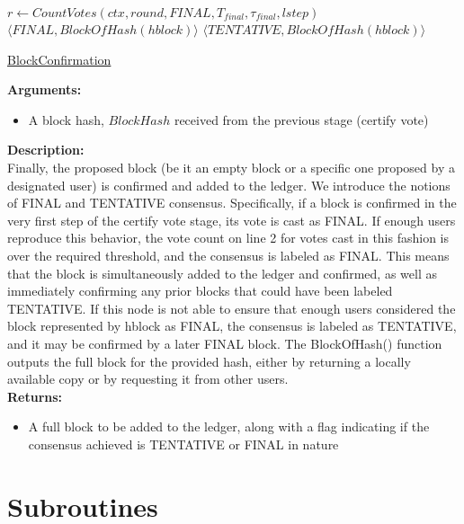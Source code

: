\documentclass[10pt,a4paper]{article}
\begin{document}
\begin{algorithm}
    \begin{algorithmic}[H]

    \State $r \gets CountVotes(ctx, round, FINAL, T_{final}, \tau_{final}, lstep)$
        \State \Return $\langle FINAL, BlockOfHash(hblock)\rangle$ 
    \Else
    {
        \State \Return $\langle TENTATIVE, BlockOfHash(hblock)\rangle $
    }
    \EndIf
    \EndFunction
    \end{algorithmic}
    \caption{\underline{BlockConfirmation}}
\end{algorithm}

\noindent \textbf{Arguments:}
\begin{itemize}
    \item A block hash, $BlockHash$ received from the previous stage (certify vote)
  \end{itemize}

\noindent \textbf{Description:}\\
Finally, the proposed block (be it an empty block or a specific one 
proposed by a designated user) is confirmed and added to the ledger.
We introduce the notions of FINAL and TENTATIVE consensus.
Specifically, if a block is confirmed in the very first step of the 
certify vote stage, its vote is cast as FINAL.
If enough users reproduce this behavior, the vote count on line 2 for 
votes cast in this fashion is over the required threshold, and the 
consensus is labeled as FINAL.
This means that the block is simultaneously added to the ledger and 
confirmed, as well as immediately confirming any prior blocks that 
could have been labeled TENTATIVE.
If this node is not able to ensure that enough users considered the 
block represented by hblock as FINAL, the consensus is labeled as 
TENTATIVE, and it may be confirmed by a later FINAL block.
The BlockOfHash() function outputs the full block for the provided 
hash, either by returning a locally available copy or by requesting 
it from other users.\\

\noindent \textbf{Returns:}
\begin{itemize}
    \item A full block to be added to the ledger, along with a flag indicating if
    the consensus achieved is TENTATIVE or FINAL in nature
  \end{itemize}

\section{Subroutines}
\end{document}
